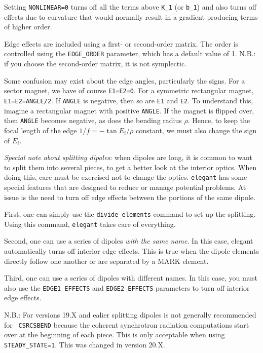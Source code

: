Setting {\tt NONLINEAR=0} turns off all the terms above {\tt K\_1} (or {\tt b\_1}) and
also turns off effects due to curvature that would
normally result in a gradient producing terms of higher order.

Edge effects are included using a first- or second-order matrix.  The
order is controlled using the {\tt EDGE\_ORDER} parameter, which has a
default value of 1.  N.B.: if you choose the second-order matrix, it
is not symplectic.

Some confusion may exist about the edge angles, particularly the signs.
For a sector magnet, we have of course \verb|E1=E2=0|.  For a symmetric rectangular
magnet, \verb|E1=E2=ANGLE/2|.  If \verb|ANGLE| is negative, then so are
\verb|E1| and \verb|E2|.  To understand this, imagine a rectangular magnet with positive \verb|ANGLE|.
If the magnet is flipped over, then \verb|ANGLE| becomes negative, as does the bending
radius $\rho$.    Hence, to keep the focal length
of the edge $1/f = -\tan E_i /\rho$ constant, we must also change the sign of
$E_i$.

{\em Special note about splitting dipoles}: when dipoles are long, it is
common to want to split them into several pieces, to get a better look
at the interior optics.  When doing this, care must be exercised not
to change the optics.  {\tt elegant} has some special features that
are designed to reduce or manage potential problems. At issue is the
need to turn off edge effects between the portions of the same dipole.

First, one can simply use the \verb|divide_elements| command to set up
the splitting.  Using this command, {\tt elegant} takes care of everything.

Second, one can use a series of dipoles {\em with the same name}.  In this case,
elegant automatically turns off interior edge effects.  This is true when the
dipole elements directly follow one another or are separated by a MARK element.

Third, one can use a series of dipoles with different names.  In this case, you
must also use the \verb|EDGE1_EFFECTS| and \verb|EDGE2_EFFECTS| parameters to
turn off interior edge effects.  

N.B.: For versions 19.X and ealier splitting dipoles is not generally recommended for {\tt
CSRCSBEND} because the coherent synchrotron radiation computations
start over at the beginning of each piece.  This is only acceptable
when using \verb|STEADY_STATE=1|.  This was changed in version 20.X.
